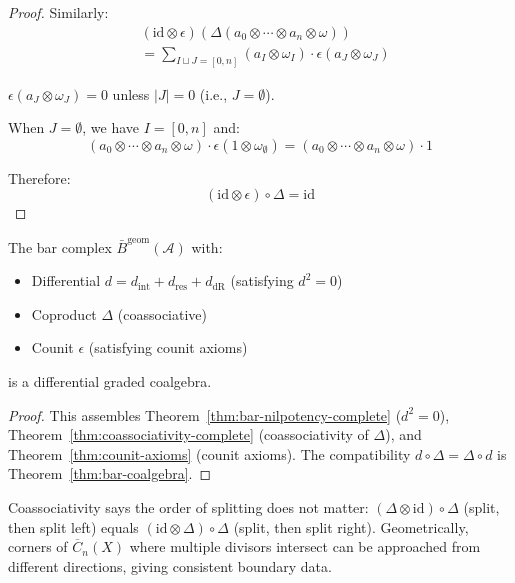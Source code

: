 \begin{proof}
Similarly:
\begin{align*}
&(\text{id} \otimes \epsilon)(\Delta(a_0 \otimes \cdots \otimes a_n \otimes \omega)) \\
&= \sum_{I \sqcup J = [0,n]} (a_I \otimes \omega_I) \cdot \epsilon(a_J \otimes \omega_J)
\end{align*}

$\epsilon(a_J \otimes \omega_J) = 0$ unless $|J| = 0$ (i.e., $J = \emptyset$).

When $J = \emptyset$, we have $I = [0,n]$ and:
\[(a_0 \otimes \cdots \otimes a_n \otimes \omega) \cdot \epsilon(1 \otimes \omega_{\emptyset}) = (a_0 \otimes \cdots \otimes a_n \otimes \omega) \cdot 1\]

Therefore:
\[(\text{id} \otimes \epsilon) \circ \Delta = \text{id}\]
\end{proof}

\begin{corollary}\label{cor:bar-is-dgcoalg}
The bar complex $\bar{B}^{\text{geom}}(\mathcal{A})$ with:
\begin{itemize}
\item Differential $d = d_{\text{int}} + d_{\text{res}} + d_{\text{dR}}$ (satisfying $d^2 = 0$)
\item Coproduct $\Delta$ (coassociative)
\item Counit $\epsilon$ (satisfying counit axioms)
\end{itemize}
is a differential graded coalgebra.
\end{corollary}
\begin{proof}
This assembles Theorem~\ref{thm:bar-nilpotency-complete} ($d^2 = 0$), Theorem~\ref{thm:coassociativity-complete} (coassociativity of $\Delta$), and Theorem~\ref{thm:counit-axioms} (counit axioms).  The compatibility $d \circ \Delta = \Delta \circ d$ is Theorem~\ref{thm:bar-coalgebra}.
\end{proof}

\begin{remark}\label{rem:coassoc-geometric}
Coassociativity says the order of splitting does not matter: $(\Delta \otimes \text{id}) \circ \Delta$ (split, then split left) equals $(\text{id} \otimes \Delta) \circ \Delta$ (split, then split right).  Geometrically, corners of $\overline{C}_n(X)$ where multiple divisors intersect can be approached from different directions, giving consistent boundary data.
\end{remark}

